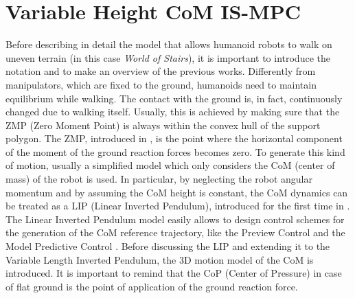 \chapter{Variable Height CoM IS-MPC}
\label{ch:vh-com-is-mpc}
Before describing in detail the model \cite{SYROCO18} that allows humanoid 
robots to walk on uneven terrain (in this case \textit{World of Stairs}),
it is important to introduce the notation and 
to make an overview of the previous works.
Differently from manipulators, which are fixed to the ground, humanoids need 
to maintain equilibrium while walking. The contact with the ground is, in fact,
continuously changed due to walking itself. Usually, this is achieved by 
making sure that the ZMP (Zero Moment Point) is always within the convex hull 
of the support polygon. The ZMP, introduced in \cite{VUKOBRATOVIC19721}, is the 
point where the horizontal component of the moment of the ground reaction forces
becomes zero. To generate this kind of motion, usually a simplified model 
which only considers the CoM (center of mass) of the robot is used.
In particular, by neglecting the robot angular momentum and by assuming the 
CoM height is constant, the CoM dynamics can be treated as a LIP (Linear 
Inverted Pendulum), introduced for the first time in \cite{Kajita1991StudyOD}.
The Linear Inverted Pendulum model easily allows to design control schemes for 
the generation of the CoM reference trajectory, like the Preview Control 
\cite{Kajita2003BipedWP} and the Model Predictive Control
\cite{wieber:inria-00390462}.
Before discussing the LIP and extending it to the Variable Length Inverted
Pendulum, the 3D motion model of the CoM is introduced. It is important to
remind that the CoP
(Center of Pressure) in case of flat ground is the point of application of
the ground reaction force.


